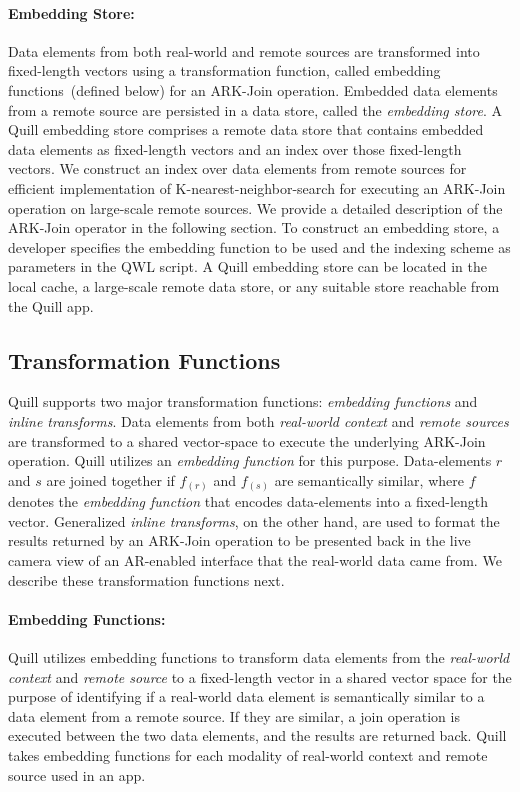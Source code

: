 \documentclass[11pt]{article}
\begin{document}
\paragraph{Embedding Store:}
\label{sec:grammar:embedding_store}
Data elements from both real-world and remote sources are transformed into fixed-length vectors using a transformation function, called embedding functions~(defined below) for an {ARK-Join} operation. Embedded data elements from a remote source are persisted in a data store, called the \textit{embedding store}.
A Quill embedding store comprises a remote data store that contains embedded data elements as fixed-length vectors and an index over those fixed-length vectors. We construct an index over data elements from remote sources for efficient implementation of K-nearest-neighbor-search for executing an ARK-Join operation on large-scale remote sources. We provide a detailed description of the ARK-Join operator in the following section. To construct an embedding store, a developer specifies the embedding function to be used and the indexing scheme as parameters in the QWL script.
A Quill embedding store can be located in the local cache, a large-scale remote data store, or any suitable store reachable from the Quill app.\vspace{0.05cm}

\subsection{Transformation Functions}
Quill supports two major transformation functions: \textit{embedding functions} and \textit{inline transforms}. Data elements from both \emph{real-world context} and \textit{remote sources} are transformed to a shared vector-space to execute the underlying ARK-Join operation. Quill utilizes an \emph{embedding function} for this purpose. Data-elements $r$ and $s$ are joined together if $f_{(r)}$ and $f_{(s)}$ are semantically similar, where $f$ denotes the \textit{embedding function} that encodes data-elements into a fixed-length vector. Generalized \emph{inline transforms}, on the other hand, are used to format the results returned by an ARK-Join operation to be presented back in the live camera view of an AR-enabled interface that the real-world data came from. We describe these transformation functions next.\vspace{0.05cm}

\paragraph{Embedding Functions:}
Quill utilizes embedding functions to transform data elements from the \textit{real-world context} and \textit{remote source} to a fixed-length vector in a shared vector space for the purpose of identifying if a real-world data element is semantically similar to a data element from a remote source. If they are similar, a join operation is executed between the two data elements, and the results are returned back. 
Quill takes embedding functions for each modality of real-world context and remote source used in an app.
\vspace{0.05cm}
\end{document}
